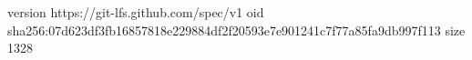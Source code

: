 version https://git-lfs.github.com/spec/v1
oid sha256:07d623df3fb16857818e229884df2f20593e7e901241c7f77a85fa9db997f113
size 1328
